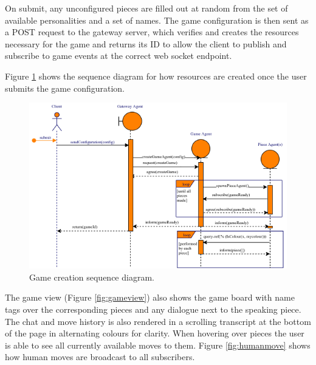 \documentclass{article}
\begin{document}
On submit, any unconfigured pieces are filled out at random from the set of available personalities and a set of names. The game configuration is then sent as a POST request to the gateway server, which verifies and creates the resources necessary for the game and returns its ID to allow the client to publish and subscribe to game events at the correct web socket endpoint.

Figure \ref{fig:gamecreation} shows the sequence diagram for how resources are created once the user submits the game configuration.

\begin{figure}[!h]
	\centering
	\includegraphics[width=\linewidth]{images/gamecreation}
	\caption{Game creation sequence diagram.}
	\label{fig:gamecreation}
\end{figure}

The game view (Figure \ref{fig:gameview}) also shows the game board with name tags over the corresponding pieces and any dialogue next to the speaking piece. The chat and move history is also rendered in a scrolling transcript at the bottom of the page in alternating colours for clarity. When hovering over pieces the user is able to see all currently available moves to them.  Figure \ref{fig:humanmove} shows how human moves are broadcast to all subscribers.
\end{document}
